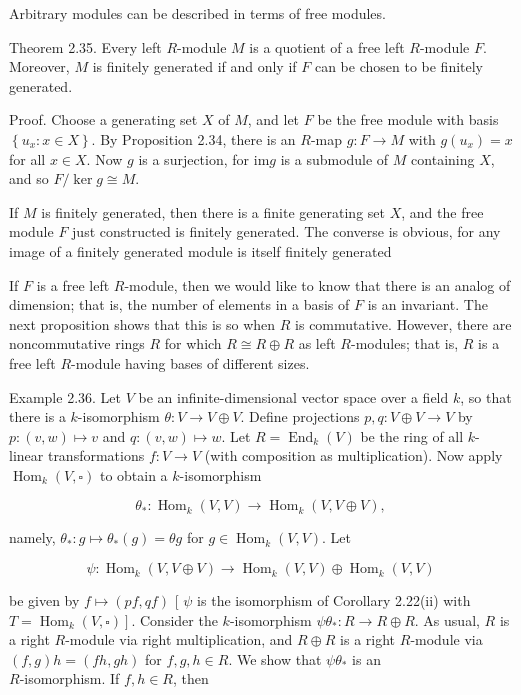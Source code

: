 \documentclass[10pt]{article}
\begin{document}
Arbitrary modules can be described in terms of free modules.

Theorem 2.35. Every left $R$-module $M$ is a quotient of a free left $R$-module $F$. Moreover, $M$ is finitely generated if and only if $F$ can be chosen to be finitely generated.

Proof. Choose a generating set $X$ of $M$, and let $F$ be the free module with basis $\left\{u_{x}: x \in X\right\}$. By Proposition 2.34, there is an $R$-map $g: F \rightarrow M$ with $g\left(u_{x}\right)=x$ for all $x \in X$. Now $g$ is a surjection, for $\mathrm{im} g$ is a submodule of $M$ containing $X$, and so $F / \operatorname{ker} g \cong M$.

If $M$ is finitely generated, then there is a finite generating set $X$, and the free module $F$ just constructed is finitely generated. The converse is obvious, for any image of a finitely generated module is itself finitely generated

If $F$ is a free left $R$-module, then we would like to know that there is an analog of dimension; that is, the number of elements in a basis of $F$ is an invariant. The next proposition shows that this is so when $R$ is commutative. However, there are noncommutative rings $R$ for which $R \cong R \oplus R$ as left $R$-modules; that is, $R$ is a free left $R$-module having bases of different sizes.

Example 2.36. Let $V$ be an infinite-dimensional vector space over a field $k$, so that there is a $k$-isomorphism $\theta: V \rightarrow V \oplus V$. Define projections $p, q: V \oplus V \rightarrow V$ by $p:(v, w) \mapsto v$ and $q:(v, w) \mapsto w$. Let $R=\operatorname{End}_{k}(V)$ be the ring of all $k$-linear transformations $f: V \rightarrow V$ (with composition as multiplication). Now apply $\operatorname{Hom}_{k}(V, \square)$ to obtain a $k$-isomorphism

$$
\theta_{*}: \operatorname{Hom}_{k}(V, V) \rightarrow \operatorname{Hom}_{k}(V, V \oplus V),
$$

namely, $\theta_{*}: g \mapsto \theta_{*}(g)=\theta g$ for $g \in \operatorname{Hom}_{k}(V, V)$. Let

$$
\psi: \operatorname{Hom}_{k}(V, V \oplus V) \rightarrow \operatorname{Hom}_{k}(V, V) \oplus \operatorname{Hom}_{k}(V, V)
$$

be given by $f \mapsto(p f, q f)$ [ $\psi$ is the isomorphism of Corollary 2.22(ii) with $\left.T=\operatorname{Hom}_{k}(V, \square)\right]$. Consider the $k$-isomorphism $\psi \theta_{*}: R \rightarrow R \oplus R$. As usual, $R$ is a right $R$-module via right multiplication, and $R \oplus R$ is a right $R$-module via $(f, g) h=(f h, g h)$ for $f, g, h \in R$. We show that $\psi \theta_{*}$ is an\\
$R$-isomorphism. If $f, h \in R$, then
\end{document}
